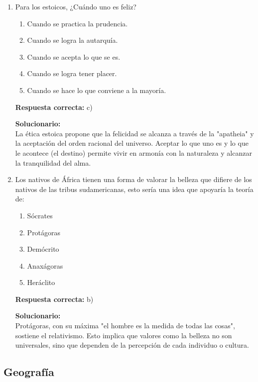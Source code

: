 \begin{enumerate}
	\item Para los estoicos, ¿Cuándo uno es feliz?
	\begin{enumerate}[label=\alph*)]
		\item Cuando se practica la prudencia.
		\item Cuando se logra la autarquía.
		\item Cuando se acepta lo que se es.
		\item Cuando se logra tener placer.
		\item Cuando se hace lo que conviene a la mayoría.
	\end{enumerate}
	\textbf{Respuesta correcta:} c)
	
	\vspace{2mm}
	\textbf{Solucionario:}\\
	La ética estoica propone que la felicidad se alcanza a través de la "apatheia" y la aceptación del orden racional del universo. Aceptar lo que uno es y lo que le acontece (el destino) permite vivir en armonía con la naturaleza y alcanzar la tranquilidad del alma.
	
	\vspace{6mm}
	
	\item Los nativos de África tienen una forma de valorar la belleza que difiere de los nativos de las tribus sudamericanas, esto sería una idea que apoyaría la teoría de:
	\begin{enumerate}[label=\alph*)]
		\item Sócrates
		\item Protágoras
		\item Demócrito
		\item Anaxágoras
		\item Heráclito
	\end{enumerate}
	\textbf{Respuesta correcta:} b)
	
	\vspace{2mm}
	\textbf{Solucionario:}\\
	Protágoras, con su máxima "el hombre es la medida de todas las cosas", sostiene el relativismo. Esto implica que valores como la belleza no son universales, sino que dependen de la percepción de cada individuo o cultura.
	
	\vspace{6mm}
	
\end{enumerate}


\subsection*{Geografía}

